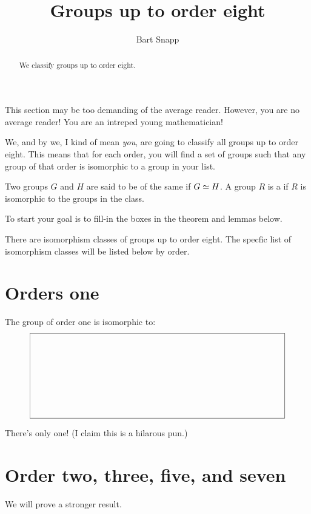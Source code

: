 \documentclass{ximera}
\author{Bart Snapp}
\title{Groups up to order eight}
\begin{document}
\begin{abstract}
  We classify groups up to order eight.
\end{abstract}
\maketitle

This section may be too demanding of the average reader. However, you
are no average reader! You are an intreped young mathematician!

We, and by we, I kind of mean \textit{you}, are going to classify all
groups up to order eight. This means that for each order, you will
find a set of groups such that any group of that order is isomorphic
to a group in your list.

\begin{definition}
  Two groups $G$ and $H$ are said to be of the same  if $G\simeq H$. A group $R$ is a  if $R$ is isomorphic to the groups in the
  class.
\end{definition}


To start your goal is to fill-in the boxes in the theorem and lemmas
below.

\begin{theorem}
  There are  isomorphism classes of groups up to
  order eight. The specfic list of isomorphism classes will be listed
  below by order.
\end{theorem}


\section{Orders one}

\begin{lemma}
  The group of order one is isomorphic to:
  \[
  \framebox(300,100){}
  \]
  \begin{sketch}
    There's only one! (I claim this is a hilarous pun.)
  \end{sketch}
\end{lemma}

\section{Order two, three, five, and seven}

We will prove a stronger result.
\end{document}
